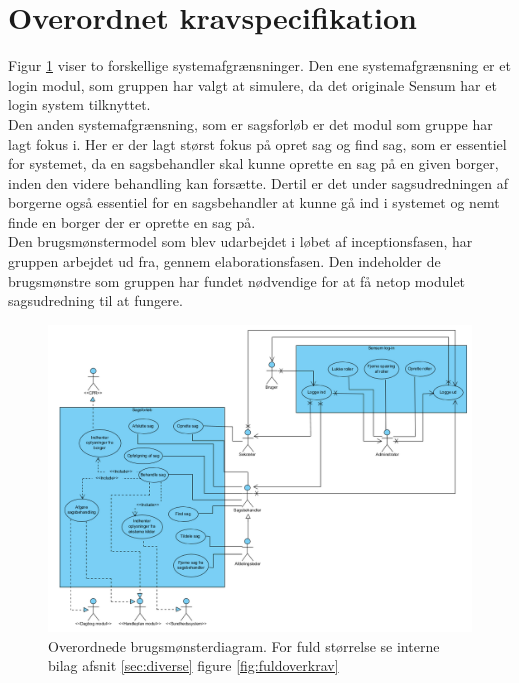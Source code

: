 \section{Overordnet kravspecifikation}
Figur \ref{fig:overkrav} viser to forskellige systemafgrænsninger. 
Den ene systemafgrænsning er et login modul, som gruppen har valgt at simulere, da det originale Sensum har et login system tilknyttet. \\
Den anden systemafgrænsning, som er sagsforløb er det modul som gruppe har lagt fokus i. 
Her er der lagt størst fokus på opret sag og find sag, som er essentiel for systemet, da en sagsbehandler skal kunne oprette en sag på en given borger, inden den videre behandling kan forsætte. Dertil er det under sagsudredningen af borgerne også essentiel for en sagsbehandler at kunne gå ind i systemet og nemt finde en borger der er oprette en sag på.\\
Den brugsmønstermodel som blev udarbejdet i løbet af inceptionsfasen, har gruppen arbejdet ud fra, gennem elaborationsfasen. Den indeholder de brugsmønstre som gruppen har fundet nødvendige for at få netop modulet sagsudredning til at fungere.
\begin{figure}[hbt!]
  \includegraphics[scale = 0.4]{./PNG/krav/overkrav.PNG} 
  \caption{Overordnede brugsmønsterdiagram. For fuld størrelse se interne bilag afsnit \ref{sec:diverse} figure \ref{fig:fuldoverkrav}}
  \label{fig:overkrav}
\end{figure}


